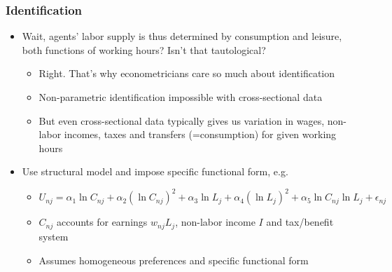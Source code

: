 \documentclass[handout,intlimits]{beamer}
\def\litc#1{\textcolor{med-gray}{\tiny\citep{#1}}}
\def\blue#1{\textcolor{zewblue}{#1}}
\begin{document}
\begin{frame}
\frametitle{Identification}
\begin{itemize}
	\item \blue{Wait, agents' labor supply is thus determined by consumption and leisure, both functions of working hours?} Isn't that tautological?
	\begin{itemize}
		\item Right. That's why econometricians care so much about identification
		\smallskip
		\item Non-parametric identification impossible with cross-sectional data \litc{manski_2014}
		\smallskip
		\item But even cross-sectional data typically gives us variation in wages, non-labor incomes, taxes and transfers (=consumption) for given working hours
	\end{itemize}
	\bigskip
	\item \blue{Use structural model and impose specific functional form}, e.g.
	\begin{itemize}
		\item $U_{nj} = \alpha_1 \ln C_{nj} + \alpha_2 (\ln C_{nj})^2 + \alpha_3 \ln L_j + \alpha_4 (\ln L_j)^2 + \alpha_5  \ln C_{nj} \ln L_j + \epsilon_{nj}$
		\smallskip
		\item $C_{nj}$ accounts for earnings $w_{nj}L_j$, non-labor income $I$ and tax/benefit system
		\smallskip
		\item Assumes homogeneous preferences and specific functional form
	\end{itemize}
\end{itemize}
\end{frame}
\end{document}
